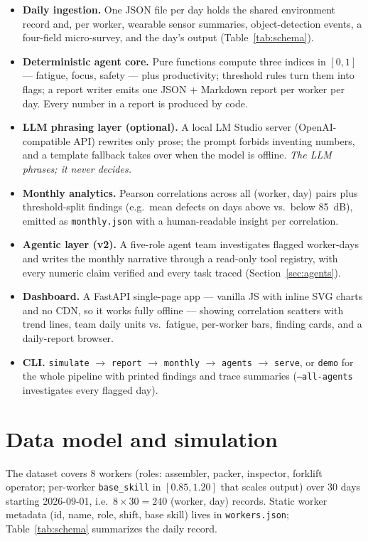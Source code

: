 \documentclass[11pt,a4paper]{article}
\begin{document}
\begin{itemize}
\item \textbf{Daily ingestion.} One JSON file per day holds the shared
environment record and, per worker, wearable sensor summaries,
object-detection events, a four-field micro-survey, and the day's output
(Table~\ref{tab:schema}).
\item \textbf{Deterministic agent core.} Pure functions compute three
indices in $[0,1]$ --- fatigue, focus, safety --- plus productivity;
threshold rules turn them into flags; a report writer emits one JSON +
Markdown report per worker per day. Every number in a report is produced by
code.
\item \textbf{LLM phrasing layer (optional).} A local LM Studio server
(OpenAI-compatible API) rewrites only prose; the prompt forbids inventing
numbers, and a template fallback takes over when the model is offline.
\emph{The LLM phrases; it never decides.}
\item \textbf{Monthly analytics.} Pearson correlations across all
(worker, day) pairs plus threshold-split findings (e.g.\ mean defects on
days above vs.\ below 85~dB), emitted as \texttt{monthly.json} with a
human-readable insight per correlation.
\item \textbf{Agentic layer (v2).} A five-role agent team investigates
flagged worker-days and writes the monthly narrative through a read-only
tool registry, with every numeric claim verified and every task traced
(Section~\ref{sec:agents}).
\item \textbf{Dashboard.} A FastAPI single-page app --- vanilla JS with
inline SVG charts and no CDN, so it works fully offline --- showing
correlation scatters with trend lines, team daily units vs.\ fatigue,
per-worker bars, finding cards, and a daily-report browser.
\item \textbf{CLI.} \texttt{simulate} $\to$ \texttt{report} $\to$
\texttt{monthly} $\to$ \texttt{agents} $\to$ \texttt{serve}, or
\texttt{demo} for the whole pipeline with printed findings and trace
summaries (\texttt{--all-agents} investigates every flagged day).
\end{itemize}

\section{Data model and simulation}
The dataset covers 8 workers (roles: assembler, packer, inspector, forklift
operator; per-worker \texttt{base\_skill} in $[0.85, 1.20]$ that scales
output) over 30 days starting 2026-09-01, i.e.\ $8 \times 30 = 240$
(worker, day) records. Static worker metadata (id, name, role, shift, base
skill) lives in \texttt{workers.json}; Table~\ref{tab:schema} summarizes
the daily record.
\end{document}
